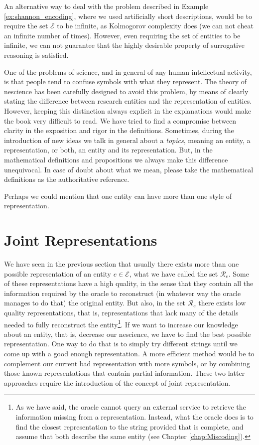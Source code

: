 An alternative way to deal with the problem described in Example \ref{ex:shannon_encoding}, where we used artificially short descriptions, would be to require the set $\mathcal{E}$ to be infinite, as Kolmogorov complexity does (we can not cheat an infinite number of times). However, even requiring the set of entities to be infinite, we can not guarantee that the highly desirable property of surrogative reasoning is satisfied.

One of the problems of science, and in general of any human intellectual activity, is that people tend to confuse symbols with what they represent. The theory of nescience has been carefully designed to avoid this problem, by means of clearly stating the difference between research entities and the representation of entities. However, keeping this distinction always explicit in the explanations would make the book very difficult to read. We have tried to find a compromise between clarity in the exposition and rigor in the definitions. Sometimes, during the introduction of new ideas we talk in general about a \emph{topics}, meaning an entity, a representation, or both, an entity and its representation. But, in the mathematical definitions and propositions we always make this difference unequivocal. In case of doubt about what we mean, please take the mathematical definitions as the authoritative reference. 

{\color{red} Perhaps we could mention that one entity can have more than one style of representation.}

%
%

\section{Joint Representations}
\label{sec:descriptions_joint_topic}

We have seen in the previous section that usually there exists more than one possible representation of an entity $e \in \mathcal{E}$, what we have called the set $\mathcal{R}_e$. Some of these representations have a high quality, in the sense that they contain all the information required by the oracle to reconstruct (in whatever way the oracle manages to do that) the original entity. But also, in the set $\mathcal{R}_e$ there exists low quality representations, that is, representations that lack many of the details needed to fully reconstruct the entity\footnote{As we have said, the oracle cannot query an external service to retrieve the information missing from a representation. Instead, what the oracle does is to find the closest representation to the string provided that is complete, and assume that both describe the same entity (see Chapter \ref{chap:Miscoding}).}. If we want to increase our knowledge about an entity, that is, decrease our nescience, we have to find the best possible representation. One way to do that is to simply try different strings until we come up with a good enough representation. A more efficient method would be to complement our current bad representation with more symbols, or by combining those known representations that contain partial information. These two latter approaches require the introduction of the concept of joint representation.

